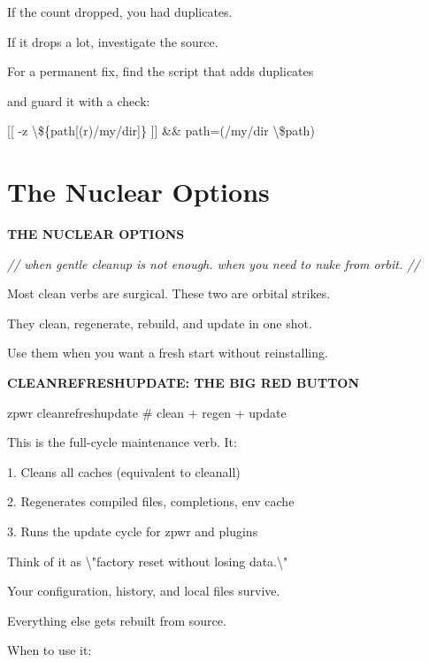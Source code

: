 \documentclass[11pt,a4paper,twoside]{book}
\begin{document}
If the count dropped, you had duplicates.

If it drops a lot, investigate the source.

For a permanent fix, find the script that adds duplicates

and guard it with a check:

[[ -z \textbackslash{}\$\{path[(r)/my/dir]\} ]] \&\& path=(/my/dir \textbackslash{}\$path)


\vspace{16pt}

\section{The Nuclear Options}


\vspace{10pt}
{\large\bfseries\color{neoncyan} THE NUCLEAR OPTIONS}\vspace{6pt}

{\small\itshape\color{dimtext} // when gentle cleanup is not enough. when you need to nuke from orbit. //}

Most clean verbs are surgical. These two are orbital strikes.

They clean, regenerate, rebuild, and update in one shot.

Use them when you want a fresh start without reinstalling.


\vspace{12pt}
{\bfseries\color{neonyellow} CLEANREFRESHUPDATE: THE BIG RED BUTTON}\vspace{4pt}

\begin{codebox}
zpwr cleanrefreshupdate             \# clean + regen + update\\
\end{codebox}

This is the full-cycle maintenance verb. It:

1. Cleans all caches (equivalent to cleanall)

2. Regenerates compiled files, completions, env cache

3. Runs the update cycle for zpwr and plugins

Think of it as \textbackslash{}"factory reset without losing data.\textbackslash{}"

Your configuration, history, and local files survive.

Everything else gets rebuilt from source.

When to use it:
\end{document}
